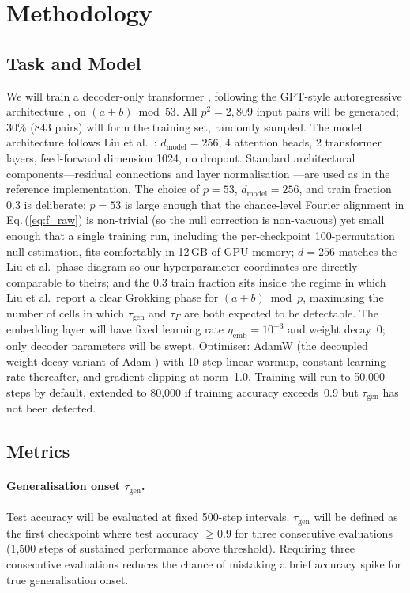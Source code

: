 \documentclass[12pt,openany,a4paper]{book}
\newcommand{\eq}[1]  {Eq.\,(\ref{#1})}
\newcommand{\taug}{\tau_{\mathrm{gen}}}
\newcommand{\tauf}{\tau_{F}}
\begin{document}
\section{Methodology}

\subsection{Task and Model}

We will train a decoder-only transformer \cite{vaswani2017attention},
following the GPT-style autoregressive architecture
\cite{radford2018gpt}, on $(a+b)\bmod 53$.
All $p^2 = 2{,}809$ input pairs will be generated; 30\% (843 pairs)
will form the training set, randomly sampled.
The model architecture follows Liu et al.\ \cite{liu2022towards}:
$d_{\mathrm{model}}=256$, 4 attention heads, 2 transformer layers,
feed-forward dimension 1024, no dropout.
Standard architectural components---residual connections
\cite{he2016resnet} and layer normalisation \cite{ba2016layernorm}---are
used as in the reference implementation.
The choice of $p=53$, $d_{\mathrm{model}}=256$, and train fraction
$0.3$ is deliberate: $p=53$ is large enough that the chance-level
Fourier alignment in \eq{eq:f_raw} is non-trivial (so the null
correction is non-vacuous) yet small enough that a single training
run, including the per-checkpoint 100-permutation null estimation,
fits comfortably in 12\,GB of GPU memory; $d=256$ matches the
Liu et al.\ phase diagram so our hyperparameter coordinates are
directly comparable to theirs; and the $0.3$ train fraction sits
inside the regime in which Liu et al.\ report a clear Grokking phase
for $(a+b)\bmod p$, maximising the number of cells in which $\taug$
and $\tauf$ are both expected to be detectable.
The embedding layer will have fixed learning rate $\eta_{\mathrm{emb}}
= 10^{-3}$ and weight decay~0; only decoder parameters will be swept.
Optimiser: AdamW \cite{loshchilov2019adamw} (the decoupled
weight-decay variant of Adam \cite{kingma2015adam}) with 10-step
linear warmup, constant learning rate thereafter, and gradient
clipping at norm~1.0.
Training will run to 50{,}000 steps by default, extended to 80{,}000
if training accuracy exceeds~0.9 but $\taug$ has not been detected.

\subsection{Metrics}

\paragraph{Generalisation onset $\taug$.}
Test accuracy will be evaluated at fixed 500-step intervals.
$\taug$ will be defined as the first checkpoint where test accuracy
$\geq 0.9$ for three consecutive evaluations (1{,}500 steps of
sustained performance above threshold).
Requiring three consecutive evaluations reduces the chance of mistaking a brief accuracy spike for true generalisation onset.
\end{document}
